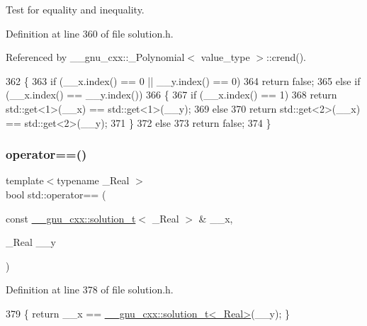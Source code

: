 Test for equality and inequality. 

Definition at line 360 of file solution.\+h.



Referenced by \+\_\+\+\_\+gnu\+\_\+cxx\+::\+\_\+\+Polynomial$<$ value\+\_\+type $>$\+::crend().


\begin{DoxyCode}
362     \{
363       \textcolor{keywordflow}{if} (\_\_x.index() == 0 || \_\_y.index() == 0)
364         \textcolor{keywordflow}{return} \textcolor{keyword}{false};
365       \textcolor{keywordflow}{else} \textcolor{keywordflow}{if} (\_\_x.index() == \_\_y.index())
366         \{
367           \textcolor{keywordflow}{if} (\_\_x.index() == 1)
368             \textcolor{keywordflow}{return} std::get<1>(\_\_x) == std::get<1>(\_\_y);
369           \textcolor{keywordflow}{else}
370             \textcolor{keywordflow}{return} std::get<2>(\_\_x) == std::get<2>(\_\_y);
371         \}
372       \textcolor{keywordflow}{else}
373         \textcolor{keywordflow}{return} \textcolor{keyword}{false};
374     \}
\end{DoxyCode}
\mbox{\label{namespacestd_a08af35ce00cff32a8b0a06b87d63f158}} 
\subsubsection{\texorpdfstring{operator==()}{operator==()}\hspace{0.1cm}{\footnotesize\ttfamily [2/5]}}
{\footnotesize\ttfamily template$<$typename \+\_\+\+Real $>$ \\
bool std\+::operator== (\begin{DoxyParamCaption}\item[{const \hyperlink{namespace____gnu__cxx_ae20ea642de50eb361074c62676b0159c}{\+\_\+\+\_\+gnu\+\_\+cxx\+::solution\+\_\+t}$<$ \+\_\+\+Real $>$ \&}]{\+\_\+\+\_\+x,  }\item[{\+\_\+\+Real}]{\+\_\+\+\_\+y }\end{DoxyParamCaption})}



Definition at line 378 of file solution.\+h.


\begin{DoxyCode}
379     \{ \textcolor{keywordflow}{return} \_\_x == \hyperlink{namespace____gnu__cxx_ae20ea642de50eb361074c62676b0159c}{\_\_gnu\_cxx::solution\_t<\_Real>}(\_\_y); \}
\end{DoxyCode}
\mbox{\label{namespacestd_ae5dda4ad56d172c7d64f58b465e3c5c2}} 
